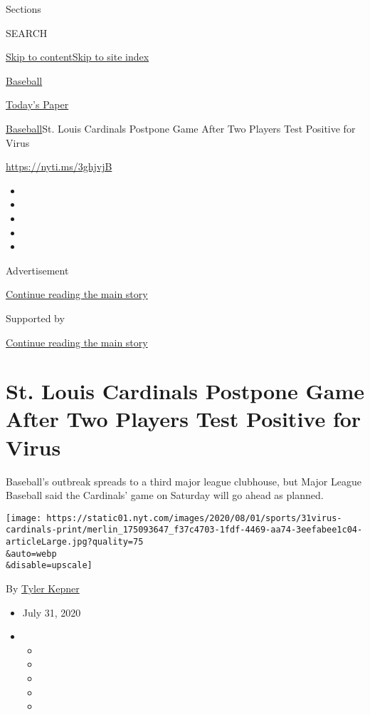 Sections

SEARCH

\protect\hyperlink{site-content}{Skip to
content}\protect\hyperlink{site-index}{Skip to site index}

\href{https://www.nytimes.com/section/sports/baseball}{Baseball}

\href{https://myaccount.nytimes.com/auth/login?response_type=cookie\&client_id=vi}{}

\href{https://www.nytimes.com/section/todayspaper}{Today's Paper}

\href{/section/sports/baseball}{Baseball}\textbar{}St. Louis Cardinals
Postpone Game After Two Players Test Positive for Virus

\url{https://nyti.ms/3ghjvjB}

\begin{itemize}
\item
\item
\item
\item
\item
\end{itemize}

Advertisement

\protect\hyperlink{after-top}{Continue reading the main story}

Supported by

\protect\hyperlink{after-sponsor}{Continue reading the main story}

\hypertarget{st-louis-cardinals-postpone-game-after-two-players-test-positive-for-virus}{%
\section{St. Louis Cardinals Postpone Game After Two Players Test
Positive for
Virus}\label{st-louis-cardinals-postpone-game-after-two-players-test-positive-for-virus}}

Baseball's outbreak spreads to a third major league clubhouse, but Major
League Baseball said the Cardinals' game on Saturday will go ahead as
planned.

\texttt{[image: https://static01.nyt.com/images/2020/08/01/sports/31virus-cardinals-print/merlin\_175093647\_f37c4703-1fdf-4469-aa74-3eefabee1c04-articleLarge.jpg?quality=75\\\&auto=webp\\\&disable=upscale]}

By \href{https://www.nytimes.com/by/tyler-kepner}{Tyler Kepner}

\begin{itemize}
\item
  July 31, 2020
\item
  \begin{itemize}
  \item
  \item
  \item
  \item
  \item
  \end{itemize}
\end{itemize}

